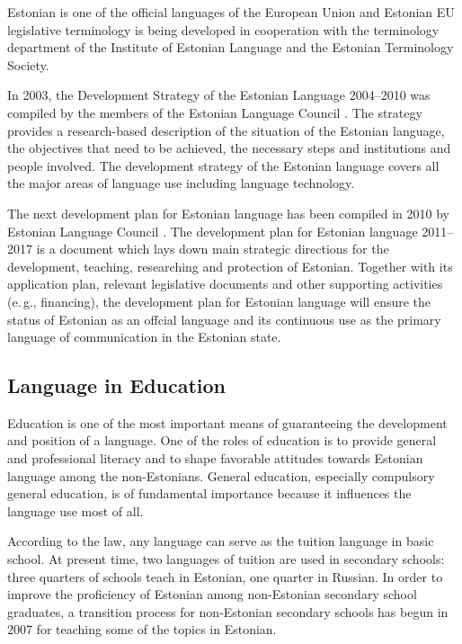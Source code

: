 \begin{multicols}{2}
Estonian is one of the official languages of the European Union and Estonian EU legislative terminology is being developed in cooperation with the terminology department of the Institute of Estonian Language and the Estonian Terminology Society.

In 2003, the Development Strategy of the Estonian Language 2004--2010 was compiled by the members of the Estonian Language Council \cite{KeeleStratEn}. 
The strategy provides a research-based description of the situation of the Estonian language, the objectives that need to be achieved, the necessary steps and institutions and people involved. 
The development strategy of the Estonian language covers all the major areas of language use including language technology.

The next development plan for Estonian language has been compiled in 2010 by Estonian Language Council \cite{DevPlan}. 
The development plan for Estonian language 2011--2017 is a document which lays down main strategic directions for the development, teaching, researching and protection of Estonian. 
Together with its application plan, relevant legislative documents and other supporting activities (e.\,g., ﬁnancing), the development plan for Estonian language will ensure the status of Estonian as an offcial language and its continuous use as the primary language of communication in the Estonian state.

\subsection{Language in Education}

Education is one of the most important means of guaranteeing the development and position of a language. 
One of the roles of education is to provide general and professional literacy and to shape favorable attitudes towards Estonian language among the non-Estonians. 
General education, especially compulsory general education, is of fundamental importance because it inﬂuences the language use most of all.

According to the law, any language can serve as the tuition language in basic school. 
At present time, two languages of tuition are used in secondary schools: three quarters of schools teach in Estonian, one quarter in Russian. 
In order to improve the proﬁciency of Estonian among non-Estonian secondary school graduates, a transition process for non-Estonian secondary schools has begun in 2007 for teaching some of the topics in Estonian.


\end{multicols}
